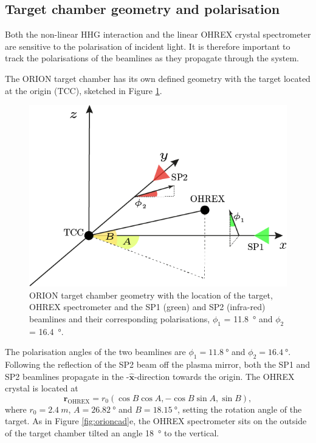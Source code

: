 \subsection{Target chamber geometry and polarisation}
Both the non-linear HHG interaction and the linear OHREX crystal spectrometer are sensitive to the polarisation of incident light. It is therefore important to track the polarisations of the beamlines as they propagate through the system.

The ORION target chamber has its own defined geometry with the target located at the origin (\ac{TCC}), sketched in Figure \ref{fig:miscoriontargetchambergeometry}.
\begin{figure}
	\centering
	\includegraphics[width=0.7\linewidth]{figures/misc/misc_ORION_target_chamber_geometry}
	\caption[ORION target chamber geometry]{ORION target chamber geometry with the location of the target, OHREX spectrometer and the SP1 (green) and SP2 (infra-red) beamlines and their corresponding polarisations, $\phi_1$ = \qty{11.8}{\degree} and $\phi_2$ = \qty{16.4}{\degree}.}
	\label{fig:miscoriontargetchambergeometry}
\end{figure}
The polarisation angles of the two beamlines are $\phi_1 = \qty{11.8}{\degree}$ and $\phi_2 = \qty{16.4}{\degree}$. Following the reflection of the SP2 beam off the plasma mirror, both the SP1 and SP2 beamlines propagate in the -$\hat{\mathbf{x}}$-direction towards the origin. The OHREX crystal is located at 
\begin{equation}
	\mathbf{r}_\mathrm{OHREX} = r_0(\cos B\cos A,-\cos B\sin A, \sin B),
\end{equation}
where $r_0 = \qty{2.4}{m}$, $A = \qty{26.82} {\degree} $ and $B = \qty{18.15}{\degree}$, setting the rotation angle of the target. As in Figure \ref{fig:orioncad}e, the OHREX spectrometer sits on the outside of the target chamber tilted an angle \qty{18}{\degree} to the vertical.

